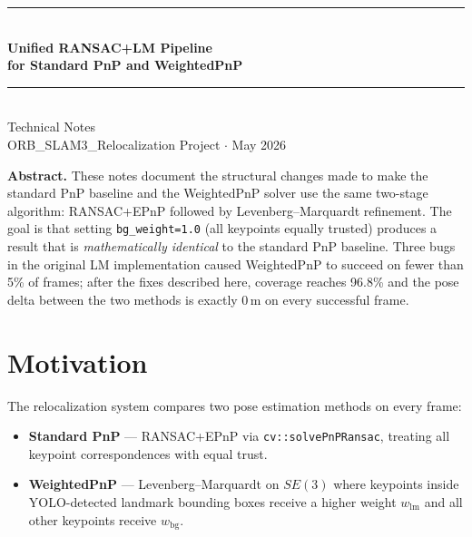 \documentclass[12pt,a4paper]{article}
\begin{document}

\begin{titlepage}
\centering
\vspace*{2cm}
{\color{hdrblue}\rule{\linewidth}{1.5pt}}\\[0.6em]
{\LARGE\bfseries\color{hdrblue} Unified RANSAC+LM Pipeline\\[0.4em]
 for Standard PnP and WeightedPnP}\\[0.4em]
{\color{hdrblue}\rule{\linewidth}{1.5pt}}\\[1.5em]
{\large Technical Notes}\\[0.5em]
{\normalsize ORB\_SLAM3\_Relocalization Project $\cdot$ May 2026}
\vspace{2cm}

\begin{tcolorbox}[colback=boxblue, colframe=hdrblue, arc=6pt, boxrule=1pt]
\textbf{Abstract.}\;
These notes document the structural changes made to make the standard PnP
baseline and the WeightedPnP solver use the same two-stage algorithm:
RANSAC+EPnP followed by Levenberg--Marquardt refinement. The goal is that
setting \texttt{bg\_weight=1.0} (all keypoints equally trusted) produces a
result that is \emph{mathematically identical} to the standard PnP baseline.
Three bugs in the original LM implementation caused WeightedPnP to succeed
on fewer than 5\% of frames; after the fixes described here, coverage reaches
96.8\% and the pose delta between the two methods is exactly 0\,m on every
successful frame.
\end{tcolorbox}
\end{titlepage}

\tableofcontents
\newpage

\section{Motivation}

The relocalization system compares two pose estimation methods on every frame:

\begin{itemize}[noitemsep]
  \item \textbf{Standard PnP} --- RANSAC+EPnP via \texttt{cv::solvePnPRansac},
        treating all keypoint correspondences with equal trust.
  \item \textbf{WeightedPnP} --- Levenberg--Marquardt on $SE(3)$ where keypoints
        inside YOLO-detected landmark bounding boxes receive a higher weight
        $w_\text{lm}$ and all other keypoints receive $w_\text{bg}$.
\end{itemize}
\end{document}
